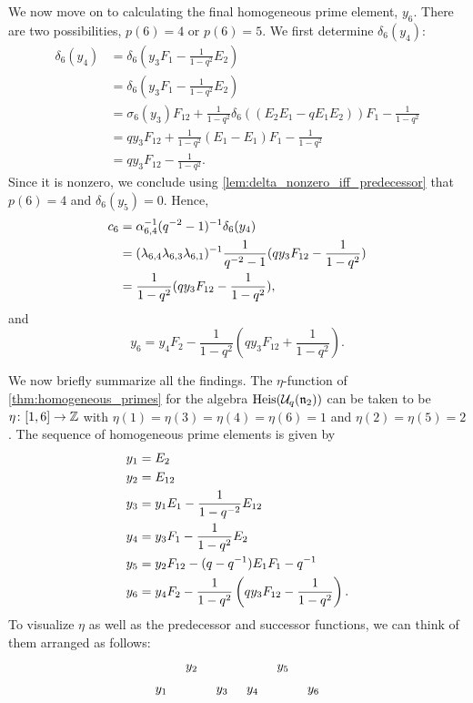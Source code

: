 \begin{example}
	We now move on to calculating the final homogeneous prime element, $y_6$. There are two possibilities, $p(6) = 4$ or $p(6) = 5$. We first determine $\delta_6(y_4)$:
	\begin{align*}
		\delta_6(y_4)
		&= \delta_6(y_3F_1- \frac{1}{1-q^2}E_2)\\
		&= \delta_6(y_3F_1- \frac{1}{1-q^2}E_2)\\
		&= \sigma_6(y_3)F_{12} + \frac{1}{1-q^2}\delta_6((E_2E_1 - q E_1 E_2))F_1- \frac{1}{1-q^2}\\
		&= qy_3F_{12} + \frac{1}{1-q^2}(E_1 - E_1)F_1- \frac{1}{1-q^2}\\
		&= qy_3F_{12} - \frac{1}{1-q^2}.
	\end{align*}
	Since it is nonzero, we conclude using \cref{lem:delta_nonzero_iff_predecessor} that $p(6) = 4$ and $\delta_6(y_5) = 0$. Hence,
	\begin{align*}
		c_6
		&= \alpha_{6, 4}^{-1} (q^{-2} - 1)^{-1} \delta_6(y_4)\\
		&= (\lambda_{6,4}\lambda_{6,3}\lambda_{6,1})^{-1} \frac{1}{q^{-2} - 1}(q y_3 F_{12} - \frac{1}{1-q^2})\\
		&= \frac{1}{1 -q^{2}}(q y_3 F_{12} - \frac{1}{1-q^2}),
	\end{align*}
	and 
	\begin{equation*}
		y_6 = y_4 F_2 - \frac{1}{1-q^2}(q y_3 F_{12} + \frac{1}{1-q^2}).
	\end{equation*}

	We now briefly summarize all the findings. The $\eta$-function of \cref{thm:homogeneous_primes} for the algebra $\operatorname{Heis}(\mathcal{U}_q(\mathfrak{n}_2))$ can be taken to be $\eta \colon [1, 6] \to \mathbb{Z}$ with $\eta(1)=\eta(3)=\eta(4)=\eta(6) = 1$ and $\eta(2) = \eta(5) = 2$. The sequence of homogeneous prime elements is given by
	\begin{align*}
	y_1 &= E_2 \\
	y_2 &= E_{12} \\
	y_3 &= y_1 E_1 - \frac{1}{1- q^{-2}}E_{12} \\
	y_4 &= y_3 F_1 - \frac{1}{1-q^2} E_2\\
	y_5 &= y_2 F_{12} - (q - q^{-1}) E_1 F_1 - q ^{-1} \\
	y_6 &= y_4 F_2 - \frac{1}{1-q^2} \left(q y_3 F_{12} - \frac{1}{1 - q^2} \right).
	\end{align*}
	To visualize $\eta$ as well as the predecessor and successor functions, we can think of them arranged as follows:
	\begin{equation*}
		\begin{tikzcd}[sep=tiny]
	    	& y_2 & & & y_5 \\
			y_1 & & y_3 & y_4 & & y_6
	    \end{tikzcd}
	\end{equation*}

\end{example}

